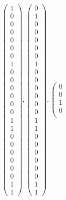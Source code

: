 \documentclass[8pt]{article}
\begin{document}
 \begin{align*} \left(\begin{array}{r}
1 \\
0 \\
0 \\
0 \\
0 \\
0 \\
0 \\
1 \\
0 \\
0 \\
0 \\
0 \\
0 \\
0 \\
1 \\
1 \\
0 \\
0 \\
0 \\
0 \\
0 \\
0 \\
1 \\
1
\end{array}\right) ,
 \left(\begin{array}{r}
0 \\
1 \\
0 \\
0 \\
0 \\
0 \\
0 \\
1 \\
0 \\
0 \\
0 \\
0 \\
0 \\
0 \\
1 \\
1 \\
0 \\
0 \\
0 \\
0 \\
0 \\
0 \\
1 \\
1
\end{array}\right) ,
 \left(\begin{array}{r}
0 \\
0 \\
1 \\
0 \\

\end{array}
\end{align*}
\end{document}
